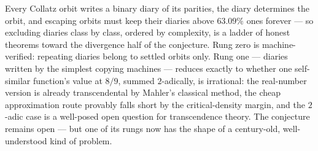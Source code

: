 \documentclass[11pt]{article}
\begin{document}
Every Collatz orbit writes a binary diary of its parities, the diary
determines the orbit, and escaping orbits must keep their diaries
above $63.09\%$ ones forever --- so excluding diaries class by class,
ordered by complexity, is a ladder of honest theorems toward the
divergence half of the conjecture. Rung zero is machine-verified:
repeating diaries belong to settled orbits only. Rung one --- diaries
written by the simplest copying machines --- reduces exactly to
whether one self-similar function's value at $8/9$, summed
$2$-adically, is irrational: the real-number version is already
transcendental by Mahler's classical method, the cheap approximation
route provably falls short by the critical-density margin, and the
$2$-adic case is a well-posed open question for transcendence theory.
The conjecture remains open --- but one of its rungs now has the
shape of a century-old, well-understood kind of problem.
\end{document}
